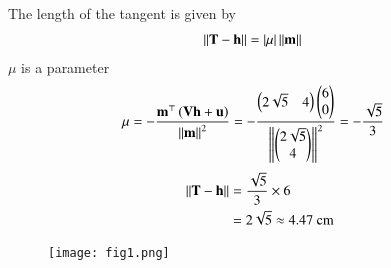\documentclass[journal]{IEEEtran}
\begin{document}
The length of the tangent is given by
\begin{align}
    \left\lVert\mathbf{T}-\mathbf{h}\right\rVert&=\left\vert\mu\right\vert \left\lVert\mathbf{m}\right\rVert
 \end{align}   
$\mu$ is a parameter
\begin{align}
    \mu&= -\dfrac{\mathbf{m}^{\top} \left(\mathbf{V}\mathbf{h} + \mathbf{u}\right)}{\left\lVert\mathbf{m}\right\rVert^2}=-\dfrac{\begin{pmatrix}2\sqrt{5} & 4\end{pmatrix} \begin{pmatrix}6\\0\end{pmatrix}}{\left\lVert\begin{pmatrix}2\sqrt{5} \\ 4\end{pmatrix}\right\rVert^2}=-\dfrac{\sqrt{5}}{3}
\end{align}
\begin{align}
    \left\lVert\mathbf{T}-\mathbf{h}\right\rVert&=\dfrac{\sqrt{5}}{3} \times 6 \\
    &=2\sqrt{5} \approx 4.47 \text{ cm}
\end{align}

\begin{figure}[H]
\centering
\texttt{[image: fig1.png]}
\caption{}
\label{fig:1}
\end{figure}
\end{document}
